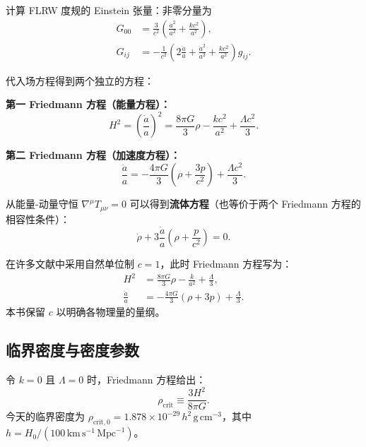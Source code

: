 计算 FLRW 度规的 Einstein 张量：非零分量为
\begin{align}
    G_{00} &= \frac{3}{c^2}\left(\frac{\dot{a}^2}{a^2} + \frac{k c^2}{a^2}\right), \\
    G_{ij} &= -\frac{1}{c^2}\left(2\frac{\ddot{a}}{a} + \frac{\dot{a}^2}{a^2} + \frac{k c^2}{a^2}\right) g_{ij}.
\end{align}

代入场方程得到两个独立的方程：

\begin{theorem}[Friedmann 方程]
\textbf{第一 Friedmann 方程（能量方程）：}
\begin{equation}
    \boxed{H^2 = \left(\frac{\dot{a}}{a}\right)^2 = \frac{8\pi G}{3}\rho - \frac{k c^2}{a^2} + \frac{\Lambda c^2}{3}}.
    \label{eq:Friedmann1}
\end{equation}

\textbf{第二 Friedmann 方程（加速度方程）：}
\begin{equation}
    \boxed{\frac{\ddot{a}}{a} = -\frac{4\pi G}{3}\left(\rho + \frac{3p}{c^2}\right) + \frac{\Lambda c^2}{3}}.
    \label{eq:Friedmann2}
\end{equation}
\label{thm:Friedmann}
\end{theorem}

从能量-动量守恒 $\nabla^\mu T_{\mu\nu} = 0$ 可以得到\textbf{流体方程}（也等价于两个 Friedmann 方程的相容性条件）：
\begin{equation}
    \boxed{\dot{\rho} + 3\frac{\dot{a}}{a}\left(\rho + \frac{p}{c^2}\right) = 0}.
    \label{eq:fluid}
\end{equation}

\begin{note}[$c=1$ 单位制]
在许多文献中采用自然单位制 $c=1$，此时 Friedmann 方程写为：
\begin{align}
    H^2 &= \frac{8\pi G}{3}\rho - \frac{k}{a^2} + \frac{\Lambda}{3}, \\
    \frac{\ddot{a}}{a} &= -\frac{4\pi G}{3}(\rho + 3p) + \frac{\Lambda}{3}.
\end{align}
本书保留 $c$ 以明确各物理量的量纲。
\end{note}

\subsection{临界密度与密度参数}

\begin{definition}[临界密度]
令 $k=0$ 且 $\Lambda=0$ 时，Friedmann 方程给出：
\begin{equation}
    \boxed{\rho_{\text{crit}} \equiv \frac{3H^2}{8\pi G}}.
    \label{eq:critical_density}
\end{equation}
今天的临界密度为 $\rho_{\text{crit},0} = 1.878 \times 10^{-29} \, h^2 \,\text{g}\,\text{cm}^{-3}$，其中 $h = H_0 / (100\,\text{km}\,\text{s}^{-1}\,\text{Mpc}^{-1})$。
\end{definition}

